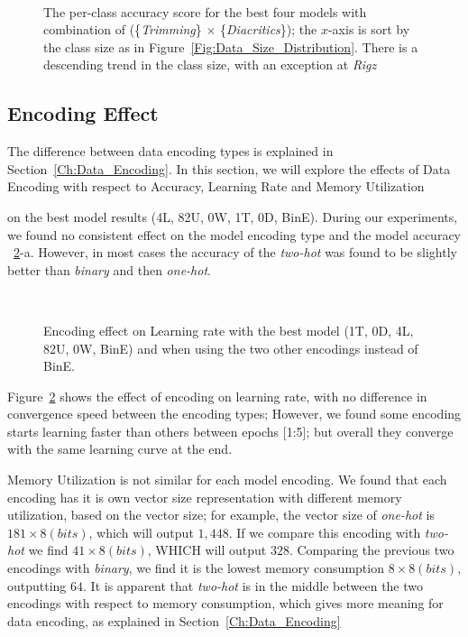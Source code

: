 {\begin{figure}[!t]
 
 \caption{The per-class accuracy score for the best four models with combination of (\{\textit{Trimming}\} $\times$ \{\textit{Diacritics}\}); the $x$-axis is sort by the class size as in Figure~\ref{Fig:Data_Size_Distribution}. There is a descending trend in the class size, with an exception at \textit{Rigz}}~\label{Fig:Results_Per_Class}
\end{figure}

\subsection{Encoding Effect}


The difference between data encoding types is explained in Section~\ref{Ch:Data_Encoding}. 
In this section, we will explore the effects of Data Encoding with respect to Accuracy, Learning Rate and Memory Utilization} on the best model results (4L, 82U, 0W, 1T, 0D, BinE). 
During our experiments, we found no consistent effect on the model encoding type and the model accuracy ~\ref{Fig:Convergence_Memory}-a. However, in most cases the accuracy of the \textit{two-hot} was found to be slightly better than \textit{binary} and then \textit{one-hot}.


\begin{figure}[!t]
 \centering
 \begin{tikzpicture}
 
 \end{tikzpicture}
 \caption{Encoding effect on Learning rate with the best model (1T, 0D, 4L, 82U, 0W, BinE) and when using the two other encodings instead of BinE.}~\label{Fig:Convergence_Memory}%
\end{figure}


Figure~\ref{Fig:Convergence_Memory} shows the effect of encoding on learning rate, with no difference in convergence speed between the encoding types; However, we found some encoding starts learning faster than others between epochs [1:5]; but overall they converge with the same learning curve at the end.

Memory Utilization is not similar for each model encoding. We found that each encoding has it is own vector size representation with different memory utilization, based on the vector size; for example, the vector size of \textit{one-hot} is $181 \times 8(bits)$, which will output $1,448$. If we compare this encoding with \textit{two-hot} we find $41 \times 8(bits)$, WHICH will output $328$. Comparing the previous two encodings with \textit{binary}, we find it is the lowest memory consumption $8 \times 8(bits)$, outputting $64$. It is apparent that \textit{two-hot} is in the middle between the two encodings with respect to memory consumption, which gives more meaning for data encoding, as explained in Section~\ref{Ch:Data_Encoding}

